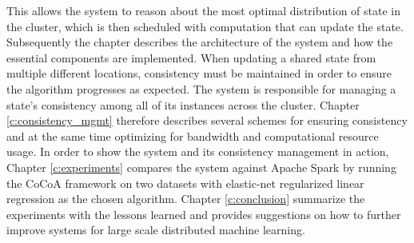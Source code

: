 This allows the system to reason about the most optimal distribution of state in the cluster, which is then scheduled with computation that can update the state.
Subsequently the chapter describes the architecture of the system and how the essential components are implemented.
When updating a shared state from multiple different locations, consistency must be maintained in order to ensure the algorithm progresses as expected. The system is responsible for managing a state's consistency among all of its instances across the cluster. Chapter \ref{c:consistency_mgmt} therefore describes several schemes for ensuring consistency and at the same time optimizing for bandwidth and computational resource usage.
In order to show the system and its consistency management in action, Chapter \ref{c:experiments} compares the system against Apache Spark by running the CoCoA framework on two datasets with elastic-net regularized linear regression as the chosen algorithm.
Chapter \ref{c:conclusion} summarize the experiments with the lessons learned and provides suggestions on how to further improve systems for large scale distributed machine learning.

